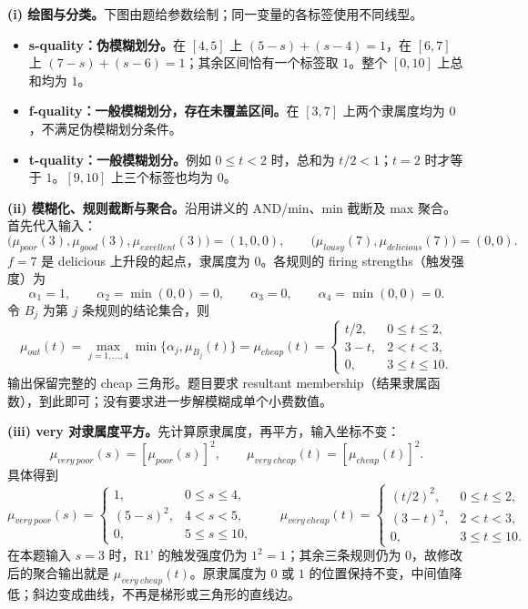 \begin{checkedsolution}
\textbf{(i) 绘图与分类。}下图由题给参数绘制；同一变量的各标签使用不同线型。
\begin{center}

\end{center}
\begin{itemize}
 \item \textbf{s-quality：伪模糊划分。}在 $[4,5]$ 上 $(5-s)+(s-4)=1$，在 $[6,7]$ 上 $(7-s)+(s-6)=1$；其余区间恰有一个标签取 $1$。整个 $[0,10]$ 上总和均为 $1$。
 \item \textbf{f-quality：一般模糊划分，存在未覆盖区间。}在 $[3,7]$ 上两个隶属度均为 $0$，不满足伪模糊划分条件。
 \item \textbf{t-quality：一般模糊划分。}例如 $0\le t<2$ 时，总和为 $t/2<1$；$t=2$ 时才等于 $1$。$[9,10]$ 上三个标签也均为 $0$。
\end{itemize}

\textbf{(ii) 模糊化、规则截断与聚合。}沿用讲义的 AND/min、min 截断及 max 聚合。首先代入输入：
\[
\bigl(\mu_{poor}(3),\mu_{good}(3),\mu_{excellent}(3)\bigr)=(1,0,0),
\qquad
\bigl(\mu_{lousy}(7),\mu_{delicious}(7)\bigr)=(0,0).
\]
$f=7$ 是 delicious 上升段的起点，隶属度为 $0$。各规则的 firing strengths（触发强度）为
\[
\alpha_1=1,\qquad\alpha_2=\min(0,0)=0,\qquad
\alpha_3=0,\qquad\alpha_4=\min(0,0)=0.
\]
令 $B_j$ 为第 $j$ 条规则的结论集合，则
\[
\mu_{out}(t)=\max_{j=1,\ldots,4}\min\{\alpha_j,\mu_{B_j}(t)\}
=\mu_{cheap}(t)=
\begin{cases}
 t/2,&0\le t\le2,\\
 3-t,&2<t<3,\\
 0,&3\le t\le10.
\end{cases}
\]
输出保留完整的 cheap 三角形。题目要求 resultant membership（结果隶属函数），到此即可；没有要求进一步解模糊成单个小费数值。

\textbf{(iii) very 对隶属度平方。}先计算原隶属度，再平方，输入坐标不变：
\[
\mu_{very\ poor}(s)=[\mu_{poor}(s)]^2,
\qquad
\mu_{very\ cheap}(t)=[\mu_{cheap}(t)]^2.
\]
具体得到
\[
\mu_{very\ poor}(s)=
\begin{cases}
 1,&0\le s\le4,\\
 (5-s)^2,&4<s<5,\\
 0,&5\le s\le10,
\end{cases}
\qquad
\mu_{very\ cheap}(t)=
\begin{cases}
 (t/2)^2,&0\le t\le2,\\
 (3-t)^2,&2<t<3,\\
 0,&3\le t\le10.
\end{cases}
\]
在本题输入 $s=3$ 时，R1' 的触发强度仍为 $1^2=1$；其余三条规则仍为 $0$，故修改后的聚合输出就是 $\mu_{very\ cheap}(t)$。原隶属度为 $0$ 或 $1$ 的位置保持不变，中间值降低；斜边变成曲线，不再是梯形或三角形的直线边。
\begin{center}

\end{center}
\end{checkedsolution}
\endgroup
